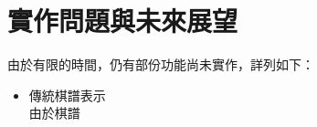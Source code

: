 	\section{實作問題與未來展望}
	由於有限的時間，仍有部份功能尚未實作，詳列如下：
	\begin{itemize}
	    \item 傳統棋譜表示\\
	    由於棋譜
	\end{itemize}